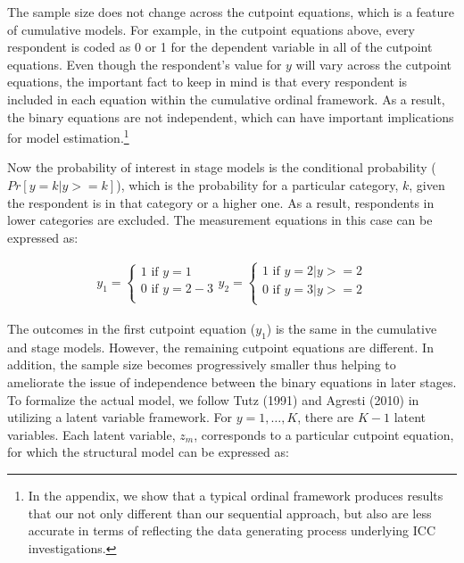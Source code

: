 The sample size does not change across the cutpoint equations, which is a feature of cumulative models. For example, in the cutpoint equations above, every respondent is coded as 0 or 1 for the dependent variable in all of the cutpoint equations. Even though the respondent's value for $y$ will vary across the cutpoint equations, the important fact to keep in mind is that every respondent is included in each equation within the cumulative ordinal framework. As a result, the binary equations are not independent, which can have important implications for model estimation.\footnote{In the appendix, we show that a typical ordinal framework produces results that our not only different than our sequential approach, but also are less accurate in terms of reflecting the data generating process underlying ICC investigations.} 

Now the probability of interest in stage models is the conditional probability ($Pr[ y = k | y >= k]$), which is the probability for a particular category, $k$, given the respondent is in that category or a higher one. As a result, respondents in lower categories are excluded. The measurement equations in this case can be expressed as: 

\begin{eqnarray}
	y_{1} =
	\begin{cases}
		1 \text{ if } y = 1 \nonumber \\
		0 \text{ if } y = 2-3 \nonumber \\
	\end{cases}
	y_{2} =
	\begin{cases}
		1 \text{ if } y = 2 | y >= 2 \nonumber \\
		0 \text{ if } y = 3 | y >= 2 \nonumber \\
	\end{cases}
\end{eqnarray}

The outcomes in the first cutpoint equation ($y_{1}$) is the same in the cumulative and stage models. However, the remaining cutpoint equations are different. In addition, the sample size becomes progressively smaller thus helping to ameliorate the issue of independence between the binary equations in later stages. To formalize the actual model, we follow Tutz (1991) and Agresti (2010) in utilizing a latent variable framework. For $y=1,\ldots,K$, there are $K-1$ latent variables. Each latent variable, $z_{m}$, corresponds to a particular cutpoint equation, for which the structural model can be expressed as:


